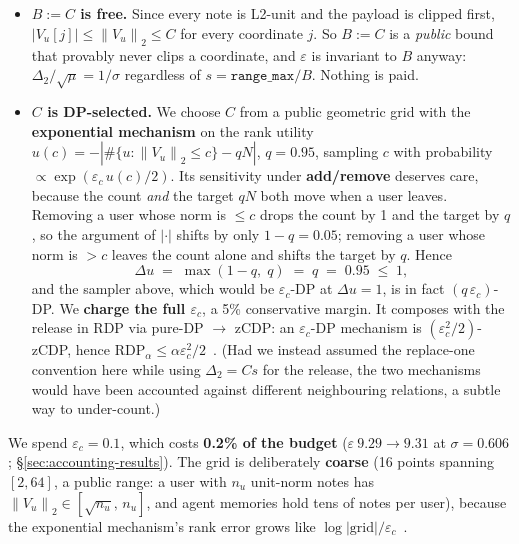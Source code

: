 \documentclass[pdflatex,sn-mathphys-num,iicol]{sn-jnl}
\theoremstyle{thmstyleone}%
\theoremstyle{thmstyletwo}%
\theoremstyle{thmstylethree}%
\newcommand{\eps}{\varepsilon}
\newcommand{\norm}[1]{\left\lVert #1 \right\rVert}
\newcommand{\secref}[1]{\S\ref{#1}}
\begin{document}
\begin{itemize}
  \item \textbf{$B := C$ is free.} Since every note is L2-unit and the payload is
    clipped first, $|V_u[j]| \leq \norm{V_u}_2 \leq C$ for every coordinate $j$. So
    $B := C$ is a \emph{public} bound that provably never clips a coordinate, and
    $\eps$ is invariant to $B$ anyway: $\Delta_2 / \sqrt{\mu} = 1/\sigma$
    regardless of $s = \texttt{range\_max}/B$. Nothing is paid.

  \item \textbf{$C$ is DP-selected.} We choose $C$ from a public geometric grid
    with the \textbf{exponential mechanism} on the rank utility
    $u(c) = -\left| \#\{u : \norm{V_u}_2 \leq c\} - q N \right|$, $q = 0.95$,
    sampling $c$ with probability $\propto \exp(\eps_c \, u(c) / 2)$. Its
    sensitivity under \textbf{add/remove} deserves care, because the count
    \emph{and} the target $qN$ both move when a user leaves. Removing a user whose
    norm is $\leq c$ drops the count by 1 and the target by $q$, so the argument of
    $|\cdot|$ shifts by only $1 - q = 0.05$; removing a user whose norm is $> c$
    leaves the count alone and shifts the target by $q$. Hence
    \begin{equation}\label{eq:clip-sens}
      \Delta u \;=\; \max(1 - q,\; q) \;=\; q \;=\; 0.95 \;\leq\; 1,
    \end{equation}
    and the sampler above, which would be $\eps_c$-DP at $\Delta u = 1$, is in
    fact $(q\,\eps_c)$-DP. We \textbf{charge the full $\eps_c$}, a 5\% conservative
    margin. It composes with the release in RDP via pure-DP $\to$ zCDP: an
    $\eps_c$-DP mechanism is $(\eps_c^2/2)$-zCDP, hence
    $\mathrm{RDP}_\alpha \leq \alpha \eps_c^2 / 2$~\cite{bun2016zcdp}. (Had we
    instead assumed the replace-one convention here while using $\Delta_2 = C s$ for
    the release, the two mechanisms would have been accounted against different
    neighbouring relations, a subtle way to under-count.)
\end{itemize}

We spend $\eps_c = 0.1$, which costs \textbf{0.2\% of the budget}
($\eps\ 9.29 \to 9.31$ at $\sigma = 0.606$; \secref{sec:accounting-results}). The
grid is deliberately \textbf{coarse} (16 points spanning $[2, 64]$, a public range:
a user with $n_u$ unit-norm notes has $\norm{V_u}_2 \in [\sqrt{n_u},\, n_u]$, and
agent memories hold tens of notes per user), because the exponential mechanism's
rank error grows like $\log|\mathrm{grid}| / \eps_c$~\cite{smith2011quantile}.
\end{document}
